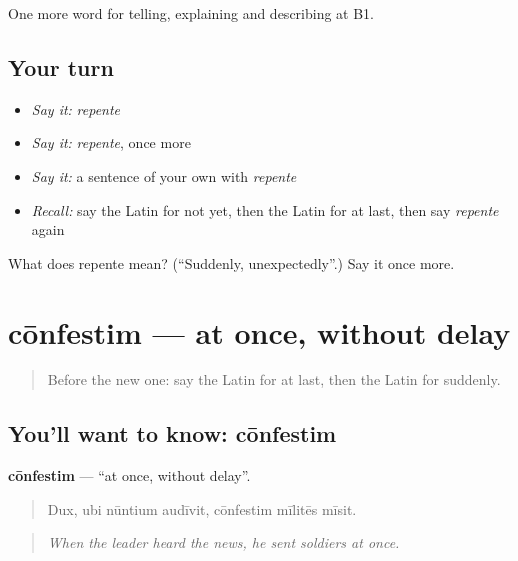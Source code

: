 \begin{grammarlens}[title={What you've built}]
One more word for telling, explaining and describing at B1.
\end{grammarlens}

\subsection*{Your turn}
\begin{itemize}
\raggedright
  \item \emph{Say it:} \emph{repente}
  \item \emph{Say it:} \emph{repente}, once more
  \item \emph{Say it:} a sentence of your own with \emph{repente}
  \item \emph{Recall:} say the Latin for not yet, then the Latin for at last, then say \emph{repente} again
\end{itemize}

\begin{tcolorbox}[breakable,colback=teal!4,colframe=teal!35!black,title={Before you move on}]
What does repente mean? (\textquotedblleft{}Suddenly, unexpectedly\textquotedblright{}.) Say it once more.
\end{tcolorbox}
\section[cōnfestim]{cōnfestim — at once, without delay}

\label{lesson:LA-C292-confestim}



\begin{quote}
Before the new one: say the Latin for at last, then the Latin for suddenly.
\end{quote}

\subsection*{You'll want to know: cōnfestim}
\textbf{cōnfestim} — \textquotedblleft{}at once, without delay\textquotedblright{}.

\begin{quote}
Dux, ubi nūntium audīvit, cōnfestim mīlitēs mīsit.
\end{quote}

\begin{quote}
\emph{When the leader heard the news, he sent soldiers at once.}
\end{quote}

